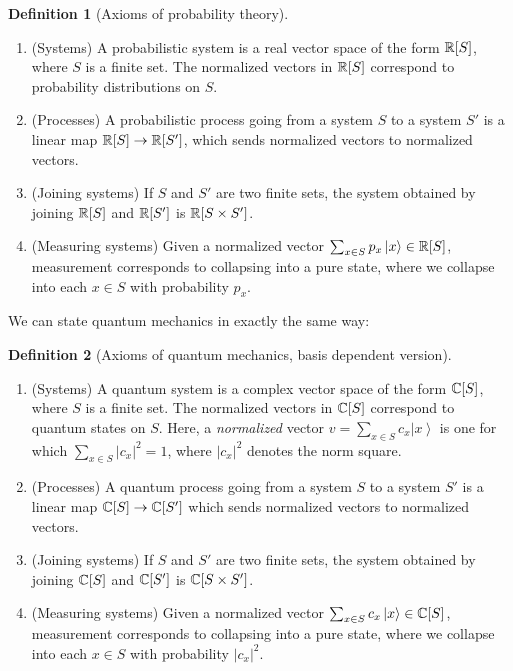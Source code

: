 \documentclass{article}
\theoremstyle{definition}
\newtheorem*{definition}{Definition}
\numberwithin{figure}{section}
\begin{document}
\begin{definition}[Axioms of probability theory] $\,$

\begin{enumerate}
\item (Systems) A probabilistic system is a real vector space of the form $\mathbb{R}[S]$, where $S$ is a finite set. The normalized vectors in $\mathbb{R}[S]$ correspond to probability distributions on $S$.
\item (Processes) A probabilistic process going from a system $S$ to a system $S'$ is a linear map $\mathbb{R}[S]\to \mathbb{R}[S']$, which sends normalized vectors to normalized vectors.
\item (Joining systems) If $S$ and $S'$ are two finite sets, the system obtained by joining $\mathbb{R}[S]$ and $\mathbb{R}[S']$ is $\mathbb{R}[S\times S']$.
\item (Measuring systems) Given a normalized vector $\sum_{x\in S}p_x \left |x\right>\in \mathbb{R}[S]$, measurement corresponds to collapsing into a pure state, where we collapse into each $x\in S$ with probability $p_x$.
\end{enumerate}

\raggedleft\qedsymbol{}
\end{definition}

We can state quantum mechanics in exactly the same way:

\begin{definition}[Axioms of quantum mechanics, basis dependent version] $\,$

\begin{enumerate}
\item (Systems) A quantum system is a complex vector space of the form $\mathbb{C}[S]$, where $S$ is a finite set. The normalized vectors in $\mathbb{C}[S]$ correspond to quantum states on $S$. Here, a \textit{normalized} vector $v=\sum_{x\in S}c_x\left|x\right>$ is one for which $\sum_{x\in S}|c_x|^2=1$, where $|c_x|^2$ denotes the norm square.
\item (Processes) A quantum process going from a system $S$ to a system $S'$ is a linear map $\mathbb{C}[S]\to \mathbb{C}[S']$ which sends normalized vectors to normalized vectors.
\item (Joining systems) If $S$ and $S'$ are two finite sets, the system obtained by joining $\mathbb{C}[S]$ and $\mathbb{C}[S']$ is $\mathbb{C}[S\times S']$.
\item (Measuring systems) Given a normalized vector $\sum_{x\in S}c_x \left |x\right>\in \mathbb{C}[S]$, measurement corresponds to collapsing into a pure state, where we collapse into each $x\in S$ with probability $|c_x|^2$.
\end{enumerate}

\raggedleft\qedsymbol{}
\end{definition}
\end{document}
